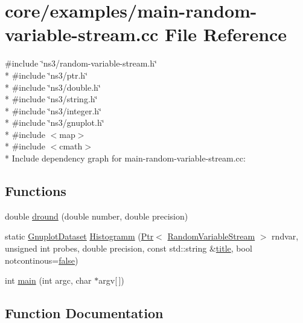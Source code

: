 \hypertarget{main-random-variable-stream_8cc}{}\section{core/examples/main-\/random-\/variable-\/stream.cc File Reference}
\label{main-random-variable-stream_8cc}
{\ttfamily \#include \char`\"{}ns3/random-\/variable-\/stream.\+h\char`\"{}}\\*
{\ttfamily \#include \char`\"{}ns3/ptr.\+h\char`\"{}}\\*
{\ttfamily \#include \char`\"{}ns3/double.\+h\char`\"{}}\\*
{\ttfamily \#include \char`\"{}ns3/string.\+h\char`\"{}}\\*
{\ttfamily \#include \char`\"{}ns3/integer.\+h\char`\"{}}\\*
{\ttfamily \#include \char`\"{}ns3/gnuplot.\+h\char`\"{}}\\*
{\ttfamily \#include $<$map$>$}\\*
{\ttfamily \#include $<$cmath$>$}\\*
Include dependency graph for main-\/random-\/variable-\/stream.cc\+:
\subsection*{Functions}
\begin{DoxyCompactItemize}
\item 
double \hyperlink{main-random-variable-stream_8cc_a03c6ffa77bf73ef1606f168290f71948}{dround} (double number, double precision)
\item 
static \hyperlink{classns3_1_1GnuplotDataset}{Gnuplot\+Dataset} \hyperlink{main-random-variable-stream_8cc_a2cfd3837ab3f2e816cf53486d7a186b5}{Histogramm} (\hyperlink{classns3_1_1Ptr}{Ptr}$<$ \hyperlink{classns3_1_1RandomVariableStream}{Random\+Variable\+Stream} $>$ rndvar, unsigned int probes, double precision, const std\+::string \&\hyperlink{lte__link__budget__x2__handover__measures_8m_a3f4b991df405379f6917e1683ed5a8c8}{title}, bool notcontinous=\hyperlink{lte__cqi__generation_8m_ab1bef239d413c4da139c4bac92cd657a}{false})
\item 
int \hyperlink{main-random-variable-stream_8cc_a0ddf1224851353fc92bfbff6f499fa97}{main} (int argc, char $\ast$argv\mbox{[}$\,$\mbox{]})
\end{DoxyCompactItemize}


\subsection{Function Documentation}
